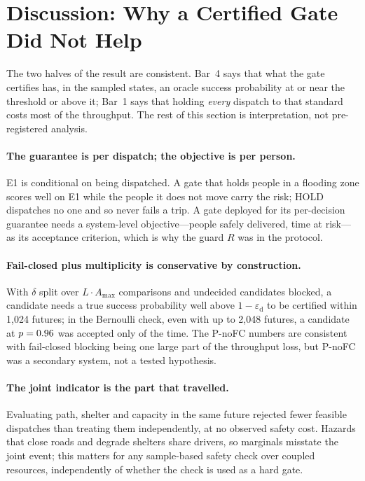 \documentclass[letterpaper]{article}
\newcommand{\epsd}{\varepsilon_{\mathrm{d}}}
\begin{document}
\section{Discussion: Why a Certified Gate Did Not Help}

The two halves of the result are consistent. Bar~4 says that what the gate certifies has, in the sampled
states, an oracle success probability at or near the threshold or above it; Bar~1 says that holding \emph{every} dispatch to that standard costs
most of the throughput. The rest of this section is interpretation, not pre-registered analysis.

\paragraph{The guarantee is per dispatch; the objective is per person.} E1 is conditional on being
dispatched. A gate that holds people in a flooding zone scores well on E1 while the people it does not
move carry the risk; HOLD dispatches no one and so never fails a trip. A gate deployed for its per-decision
guarantee needs a system-level objective---people safely delivered, time at risk---as its acceptance
criterion, which is why the guard $R$ was in the protocol.

\paragraph{Fail-closed plus multiplicity is conservative by construction.} With $\delta$ split over
$L\cdot A_{\max}$ comparisons and undecided candidates blocked, a candidate needs a true success
probability well above $1-\epsd$ to be certified within 1{,}024 futures; in the Bernoulli check, even with up to 2{,}048 futures, a
candidate at $p=0.96$ was accepted only \nCovAccNinetySix{} of the time. The P-noFC numbers
are consistent with fail-closed blocking being one large part of the throughput loss, but P-noFC was a
secondary system, not a tested hypothesis.

\paragraph{The joint indicator is the part that travelled.} Evaluating path, shelter and capacity in the
same future rejected fewer feasible dispatches than treating them independently, at no observed safety
cost. Hazards that close roads and degrade shelters share drivers, so marginals misstate the joint
event; this matters for any sample-based safety check over coupled resources, independently of whether
the check is used as a hard gate.
\end{document}
